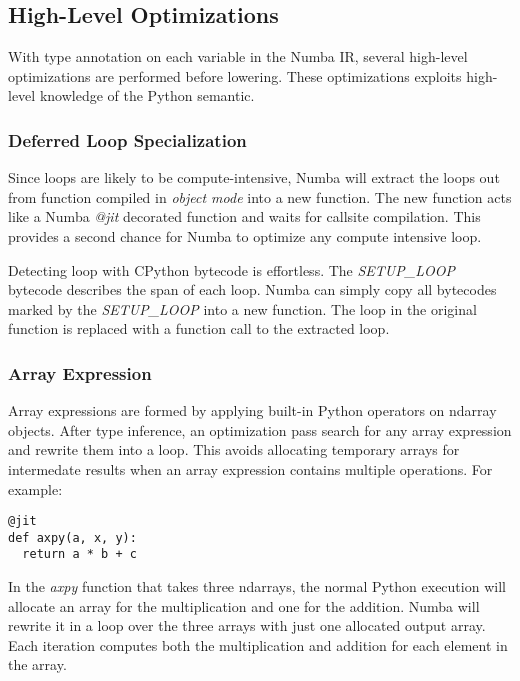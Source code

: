 \documentclass{acm_proc_article-sp}
\begin{document}
\subsection{High-Level Optimizations}

With type annotation on each variable in the Numba IR, several high-level
optimizations are performed before lowering. These optimizations exploits
high-level knowledge of the Python semantic.

\subsubsection{Deferred Loop Specialization}

Since loops are likely to be compute-intensive, Numba will extract the loops
out from function compiled in \textit{object mode} into a new function.
The new function acts like a Numba \textit{@jit} decorated function and
waits for callsite compilation. This provides a second chance for Numba to
optimize any compute intensive loop.

Detecting loop with CPython bytecode is effortless. The \textit{SETUP\_LOOP}
bytecode describes the span of each loop. Numba can simply copy all
bytecodes marked by the \textit{SETUP\_LOOP} into a new function. The loop in
the original function is replaced with a function call to the extracted loop.

\subsubsection{Array Expression}

Array expressions are formed by applying built-in Python operators on
ndarray objects. After type inference, an optimization pass search for any
array expression and rewrite them into a loop. This avoids allocating
temporary arrays for intermedate results when an array expression contains
multiple operations.  For example:

\begin{lstlisting}
@jit
def axpy(a, x, y):
  return a * b + c
\end{lstlisting}

In the \textit{axpy} function that takes three ndarrays, the normal Python
execution will allocate an array for the multiplication and one for the
addition. Numba will rewrite it in a loop over the three arrays with just
one allocated output array.  Each iteration computes both the multiplication
and addition for each element in the array.
\end{document}
